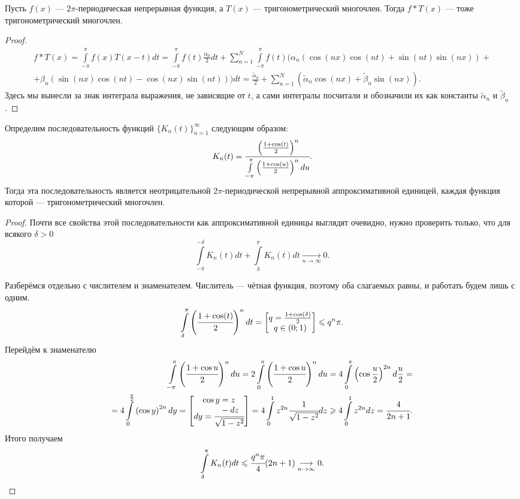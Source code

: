 \begin{Lemma}
	Пусть $f(x)$ --- $2\pi$-периодическая непрерывная функция, а $T(x)$ --- тригонометрический многочлен. Тогда $f*T(x)$ --- тоже тригонометрический многочлен.
\end{Lemma}
\begin{proof}
	\begin{align*}
	f*T(x) = \int \limits_{-\pi}^{\pi}f(x)T(x - t)dt = \int \limits_{-\pi}^{\pi}f(t)\frac{\alpha_0}{2}dt +\sum\limits_{n=1}^{N} \int \limits_{-\pi}^{\pi}f(t)(\alpha_n(\cos(nx)\cos(nt) + \sin(nt)\sin(nx)) +\\+ \beta_n(\sin(nx)\cos(nt) - \cos(nx)\sin(nt)))dt = \frac{\widetilde{\alpha}_0}{2} + \sum \limits_{n=1}^{N}\left(\widetilde{\alpha}_n\cos(nx) + \widetilde{\beta}_n\sin(nx)\right).
	\end{align*}
	Здесь мы вынесли за знак интеграла выражения, не зависящие от $t$, а сами интегралы посчитали и обозначили их как константы $\widetilde{\alpha}_n$ и $\widetilde{\beta}_n$.
\end{proof}
\begin{Lemma}
	Определим последовательность функций $\{K_n(t)\}_{n=1}^{\infty}$ следующим образом:
	$$
		K_n(t) = \cfrac{\left(\frac{1+\cos(t)}{2}\right)^n}{\int\limits_{-\pi}^{\pi} \left(\frac{1 + \cos(u)}{2}\right)^ndu}.
	$$
	Тогда эта последовательность является неотрицательной $2\pi$-периодической непрерывной аппроксимативной единицей, каждая функция которой --- тригонометрический многочлен. 
\end{Lemma}
\begin{proof}
    Почти все свойства этой последовательности как аппроксимативной единицы выглядят очевидно, нужно проверить только, что для всякого $\delta > 0$
	$$
		\int\limits_{-\pi}^{-\delta}K_n(t) dt + \int\limits_{\delta}^{\pi}K_n(t) dt \underset{n\to \infty}{\longrightarrow} 0.
	$$

Разберёмся отдельно с числителем и знаменателем.
Числитель --- чётная функция, поэтому оба слагаемых равны, и работать будем лишь с одним.
$$
	\int\limits_{\delta}^{\pi}\left(\cfrac{1 + \cos(t)}{2}\right)^n dt = \begin{bmatrix} q = \frac{1 + \cos(\delta)}{2}\\
	q \in (0;1)
	\end{bmatrix} \leqslant q^n\pi.
$$
Перейдём к знаменателю
\begin{align*}
	\int\limits_{-\pi}^{\pi} \left(\cfrac{1 + \cos u}{2}\right)^n du = 2\int\limits_{0}^{\pi} \left(\cfrac{1 + \cos u}{2}\right)^n du = 4 \int\limits_{0}^{\pi} \left(\cos\frac{u}{2}\right)^{2n} d\frac{u}{2} = \\ =
	4 \int\limits_{0}^{\frac{\pi}{2}} \left(\cos y\right)^{2n} dy = \begin{bmatrix}
		\cos y = z\\
		dy = \cfrac{-dz}{\sqrt{1 - z^2}}
		\end{bmatrix} = 4 \int\limits_{0}^{1} z^{2n} \cfrac{1}{\sqrt{1-z^2}}dz \geqslant 4\int\limits_{0}^{1} z^{2n}dz = \cfrac{4}{2n+1}.
\end{align*}
Итого получаем
$$
	\int\limits_{\delta}^{\pi}K_n(t) dt \leqslant \cfrac{q^n\pi}{4}(2n+1) \underset{n \to \infty}{\longrightarrow} 0.
$$
\end{proof}
